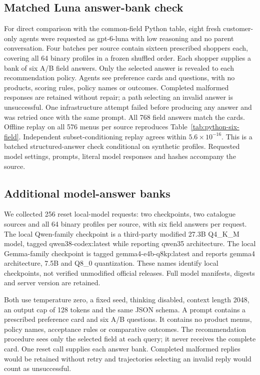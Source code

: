 \documentclass[sigconf,anonymous,review]{acmart}
\begin{document}
\subsection*{Matched Luna answer-bank check}
For direct comparison with the common-field Python table, eight fresh customer-only agents were requested as gpt-6-luna with low reasoning and no parent conversation. Four batches per source contain sixteen prescribed shoppers each, covering all 64 binary profiles in a frozen shuffled order. Each shopper supplies a bank of six A/B field answers. Only the selected answer is revealed to each recommendation policy. Agents see preference cards and questions, with no products, scoring rules, policy names or outcomes. Completed malformed responses are retained without repair; a path selecting an invalid answer is unsuccessful. One infrastructure attempt failed before producing any answer and was retried once with the same prompt. All 768 field answers match the cards. Offline replay on all 576 menus per source reproduces Table~\ref{tab:python-six-field}. Independent subset-conditioning replay agrees within $5.6\times10^{-16}$. This is a batched structured-answer check conditional on synthetic profiles. Requested model settings, prompts, literal model responses and hashes accompany the source.

\subsection*{Additional model-answer banks}
We collected 256 reset local-model requests: two checkpoints, two catalogue sources and all 64 binary profiles per source, with six field answers per request. The local Qwen-family checkpoint is a third-party modified 27.3B Q4\_K\_M model, tagged qwen38-codex:latest while reporting qwen35 architecture. The local Gemma-family checkpoint is tagged gemma4-e4b-q8kp:latest and reports gemma4 architecture, 7.5B and Q8\_0 quantization. These names identify local checkpoints, not verified unmodified official releases. Full model manifests, digests and server version are retained.

Both use temperature zero, a fixed seed, thinking disabled, context length 2048, an output cap of 128 tokens and the same JSON schema. A prompt contains a prescribed preference card and six A/B questions. It contains no product menus, policy names, acceptance rules or comparative outcomes. The recommendation procedure sees only the selected field at each query; it never receives the complete card. One reset call supplies each answer bank. Completed malformed replies would be retained without retry and trajectories selecting an invalid reply would count as unsuccessful.
\end{document}
